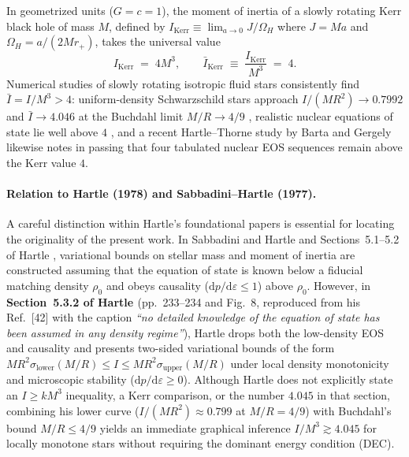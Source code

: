 \documentclass[11pt]{article}
\theoremstyle{plain}
\theoremstyle{definition}
\newcommand{\dd}{\mathrm{d}}
\newcommand{\eps}{\varepsilon}
\newcommand{\Ibar}{\bar{I}}
\begin{document}
In geometrized units ($G = c = 1$), the moment of inertia of a slowly rotating Kerr black hole of mass $M$, defined by $I_{\mathrm{Kerr}} \equiv \lim_{a \to 0} J/\Omega_H$ where $J = M a$ and $\Omega_H = a/(2 M r_+)$, takes the universal value
\begin{equation}
  I_{\mathrm{Kerr}} \;=\; 4 M^3, \qquad \Ibar_{\mathrm{Kerr}} \;\equiv\; \frac{I_{\mathrm{Kerr}}}{M^3} \;=\; 4.
  \label{eq:kerr-inertia}
\end{equation}
Numerical studies of slowly rotating isotropic fluid stars consistently find $\Ibar = I/M^3 > 4$: uniform-density Schwarzschild stars approach $I/(MR^2) \to 0.7992$ and $\Ibar \to 4.046$ at the Buchdahl limit $M/R \to 4/9$ \cite{ChandrasekharMiller1974,Posada2017}, realistic nuclear equations of state lie well above $4$ \cite{YagiYunes2013,BreuRezzolla2016}, and a recent Hartle--Thorne study by Barta and Gergely \cite{BartaGergely2026} likewise notes in passing that four tabulated nuclear EOS sequences remain above the Kerr value $4$.

\paragraph{Relation to Hartle (1978) and Sabbadini--Hartle (1977).}
A careful distinction within Hartle's foundational papers is essential for locating the originality of the present work. In Sabbadini and Hartle \cite{SabbadiniHartle1977} and Sections~5.1--5.2 of Hartle \cite{Hartle1978}, variational bounds on stellar mass and moment of inertia are constructed assuming that the equation of state is known below a fiducial matching density $\rho_0$ and obeys causality ($\dd p/\dd\eps \le 1$) above $\rho_0$. However, in \textbf{Section~5.3.2 of Hartle \cite{Hartle1978}} (pp.~233--234 and Fig.~8, reproduced from his Ref.~[42] with the caption \emph{``no detailed knowledge of the equation of state has been assumed in any density regime''}), Hartle drops both the low-density EOS and causality and presents two-sided variational bounds of the form $M R^2 \sigma_{\mathrm{lower}}(M/R) \le I \le M R^2 \sigma_{\mathrm{upper}}(M/R)$ under local density monotonicity and microscopic stability ($\dd p/\dd\eps \ge 0$). Although Hartle does not explicitly state an $I \ge k M^3$ inequality, a Kerr comparison, or the number $4.045$ in that section, combining his lower curve ($I/(MR^2) \approx 0.799$ at $M/R = 4/9$) with Buchdahl's bound $M/R \le 4/9$ yields an immediate graphical inference $I/M^3 \gtrsim 4.045$ for locally monotone stars without requiring the dominant energy condition (DEC).
\end{document}
